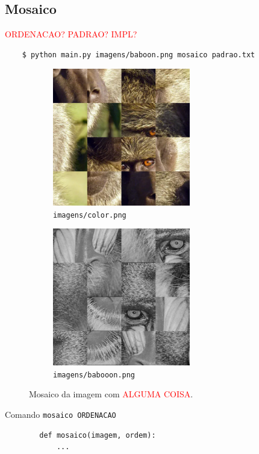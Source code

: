\subsection{Mosaico} \label{sec:mosaico}

\textcolor{red}{ORDENACAO? PADRAO? IMPL?}

\begin{verbatim}
    $ python main.py imagens/baboon.png mosaico padrao.txt
\end{verbatim}

\begin{figure}[H]
    \centering
    \begin{subfigure}{0.45\textwidth}
        \centering
        \includegraphics[width=6cm]{resultados/colormsc.png}
        \caption{\texttt{imagens/color.png}}
    \end{subfigure}%
    \begin{subfigure}{0.45\textwidth}
        \centering
        \includegraphics[width=6cm]{resultados/baboonmsc.png}
        \caption{\texttt{imagens/babooon.png}}
    \end{subfigure}

    \caption{Mosaico da imagem com \textcolor{red}{ALGUMA COISA}.}
\end{figure}

\begin{listing}[H]
    \caption{Comando \texttt{mosaico ORDENACAO}}

    \begin{verbatim}
        def mosaico(imagem, ordem):
            ...
    \end{verbatim}
\end{listing}
